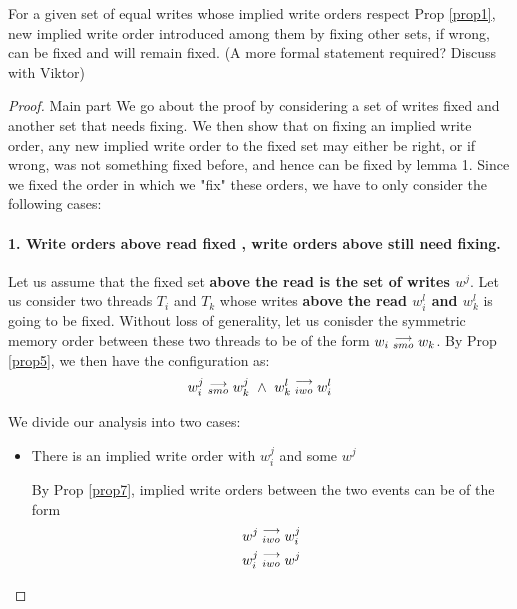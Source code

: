 
        \begin{lemma}
            For a given set of equal writes whose implied write orders respect Prop \ref{prop1}, new implied write order introduced among them by fixing other sets, if wrong, can be fixed and will remain fixed. 
            (A more formal statement required? Discuss with Viktor)        
        \end{lemma}

        \begin{proof}{Main part}
            We go about the proof by considering a set of writes fixed and another set that needs fixing. 
            We then show that on fixing an implied write order, any new implied write order to the fixed set may either be right, or if wrong, was not something fixed before, and hence can be fixed by lemma 1. 
            Since we fixed the order in which we "fix" these orders, we have to only consider the following cases:
            \paragraph{1. Write orders above read fixed , write orders above still need fixing.}

                Let us assume that the fixed set \textbf{above the read is the set of writes $w^j$}. Let us consider two threads $T_i$ and $T_k$ whose writes \textbf{above the read $w_i^l$ and $w_k^l$} is going to be fixed. Without loss of generality, let us conisder the symmetric memory order between these two threads to be of the form $w_i\stackrel{\longrightarrow}{_{smo}}w_k$.  By Prop \ref{prop5}, we then have the configuration as:
                \begin{align*}
                    \reln{w_i^j}{smo}{w_k^j} \ \wedge \ \reln{w_k^l}{iwo}{w_i^l}
                \end{align*}

                We divide our analysis into two cases: 
                
                \begin{itemize}
                    \item There is an implied write order with $w_i^j$ and some $w^j$

                        By Prop \ref{prop7}, implied write orders between the two events can be of the form 
                        \begin{align*}
                            w^j\stackrel{\longrightarrow}{_{iwo}}w_i^j \\
                            w_i^j\stackrel{\longrightarrow}{_{iwo}}w^j
                        \end{align*}


\end{itemize}
\end{proof}
